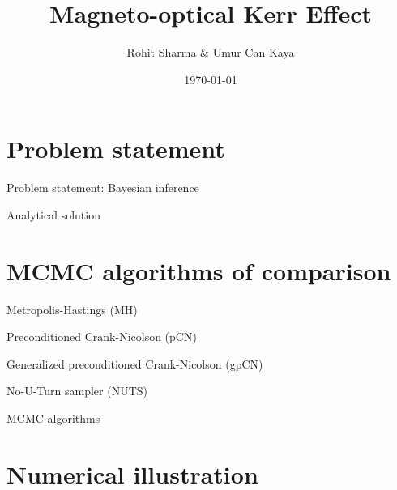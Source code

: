 \documentclass[aspectratio=169,xcolor=dvipsnames]{beamer}
\title[short title]{Magneto-optical Kerr Effect}
\author{Rohit Sharma \& Umur Can Kaya}
\institute[PTB] %
{
    Freie Universit\"{a}t Berlin\\
    Advanced Laboratory Course WS 21-22
    \vskip 3pt
}
\date{\today} %
\begin{document}
\begin{frame}
    \titlepage
\end{frame}

\section{Problem statement}

\begin{frame}{Problem statement: Bayesian inference}

\end{frame}

\begin{frame}{Analytical solution}

\end{frame}

\section{MCMC algorithms of comparison}
\begin{frame}{Metropolis-Hastings (MH)}

\end{frame}

\begin{frame}{Preconditioned Crank-Nicolson (pCN)}

\end{frame}

\begin{frame}{Generalized preconditioned Crank-Nicolson (gpCN)}

\end{frame}

\begin{frame}{No-U-Turn sampler (NUTS)}

\end{frame}

\begin{frame}{MCMC algorithms}

\end{frame}

\section{Numerical illustration}
\end{document}
